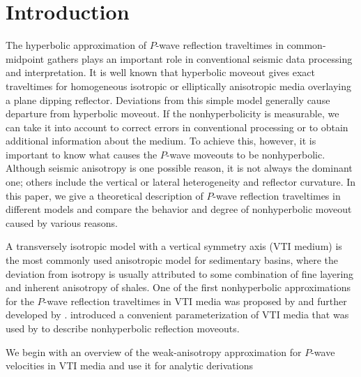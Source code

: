 \section{Introduction}
The hyperbolic approximation of $P$-wave reflection traveltimes in
common-midpoint gathers plays an important role in conventional
seismic data processing and interpretation. It is well known that
hyperbolic moveout gives exact traveltimes for homogeneous isotropic
or elliptically anisotropic media overlaying a plane dipping
reflector. Deviations from this simple model generally cause departure
from hyperbolic moveout.
If the nonhyperbolicity is measurable, we can 
take it into account to correct
errors in conventional processing or to obtain additional information
about the medium. To achieve this, however, it is important to know
what causes the $P$-wave moveouts to be nonhyperbolic. Although
seismic anisotropy is one possible reason, it is not always the 
dominant one; others include
the vertical or lateral heterogeneity and reflector curvature. 
In this paper, we give a theoretical description of $P$-wave
reflection traveltimes in different models and compare the behavior and degree of
nonhyperbolic moveout caused by various reasons.
\par A transversely isotropic model with a vertical symmetry axis (VTI
medium) is the most commonly used anisotropic model for sedimentary
basins, where the deviation from isotropy is usually attributed to
some combination of fine layering and inherent anisotropy of
shales. One of the first nonhyperbolic approximations for the $P$-wave
reflection traveltimes in VTI media was proposed by
\cite{Muir.sep.44.55} and further developed by
\cite{Dellinger.jse.92.23}.  \cite{GEO51-10-19541966} introduced a
convenient parameterization of VTI media that was used by
\cite{tsvantom} to describe nonhyperbolic reflection moveouts.  \par
We begin with an overview of the weak-anisotropy approximation for
$P$-wave velocities in VTI media and use it for analytic derivations
